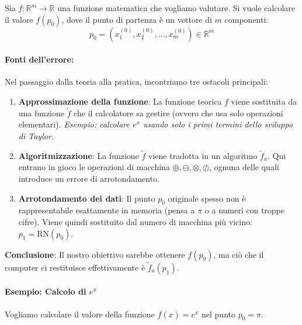 \documentclass[a4paper,12pt]{article}
\begin{document}
	Sia $f: \mathbb{R}^m \to \mathbb{R}$ una funzione matematica che vogliamo valutare.
	Si vuole calcolare il valore $f(p_0)$, dove il punto di partenza è un vettore di $m$ componenti:
	\[
	p_0 = (x_1^{(0)}, x_2^{(0)}, \dots, x_m^{(0)}) \in \mathbb{R}^m
	\]
	
	\paragraph{Fonti dell'errore:}
	Nel passaggio dalla teoria alla pratica, incontriamo tre ostacoli principali:
	
	\begin{enumerate}
		\item \textbf{Approssimazione della funzione}: La funzione teorica $f$ viene sostituita da una funzione $\tilde{f}$ che il calcolatore sa gestire (ovvero che usa solo operazioni elementari). 
		\textit{Esempio: calcolare $e^x$ usando solo i primi termini dello sviluppo di Taylor.}
		
		\item \textbf{Algoritmizzazione}: La funzione $\tilde{f}$ viene tradotta in un algoritmo $\tilde{f}_a$. Qui entrano in gioco le operazioni di macchina $\oplus, \ominus, \otimes, \oslash$, ognuna delle quali introduce un errore di arrotondamento.
		
		\item \textbf{Arrotondamento dei dati}: Il punto $p_0$ originale spesso non è rappresentabile esattamente in memoria (pensa a $\pi$ o a numeri con troppe cifre). Viene quindi sostituito dal numero di macchina più vicino: $p_1 = \mathrm{RN}(p_0)$.
	\end{enumerate}
	
	\begin{tcolorbox}[colback=yellow!5!white, colframe=yellow!50!black]
		\textbf{Conclusione}: Il nostro obiettivo sarebbe ottenere $f(p_0)$, ma ciò che il computer ci restituisce effettivamente è $\tilde{f}_a(p_1)$.
	\end{tcolorbox}
	\paragraph{Esempio: Calcolo di $e^{\pi}$}
	
	Vogliamo calcolare il valore della funzione $f(x) = e^x$ nel punto $p_0 = \pi$.
	
\end{document}
